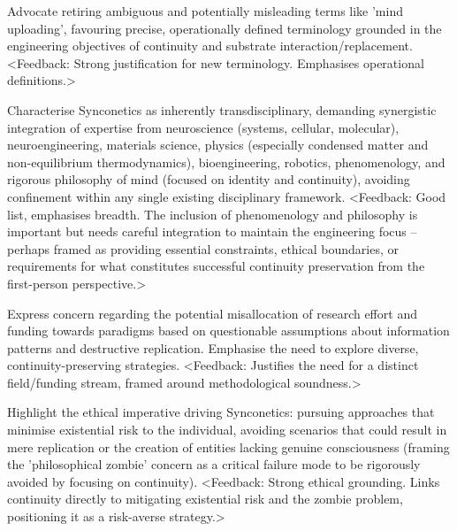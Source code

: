 \documentclass[10pt]{article}
\begin{document}
\begin{sloppypar}
  Advocate retiring ambiguous and potentially misleading terms like 'mind uploading', favouring precise, operationally defined terminology grounded in the engineering objectives of continuity and substrate interaction/replacement. <Feedback: Strong justification for new terminology. Emphasises operational definitions.>

  Characterise Synconetics as inherently transdisciplinary, demanding synergistic integration of expertise from neuroscience (systems, cellular, molecular), neuroengineering, materials science, physics (especially condensed matter and non-equilibrium thermodynamics), bioengineering, robotics, phenomenology, and rigorous philosophy of mind (focused on identity and continuity), avoiding confinement within any single existing disciplinary framework. <Feedback: Good list, emphasises breadth. The inclusion of phenomenology and philosophy is important but needs careful integration to maintain the engineering focus – perhaps framed as providing essential constraints, ethical boundaries, or requirements for what constitutes successful continuity preservation from the first-person perspective.>

  Express concern regarding the potential misallocation of research effort and funding towards paradigms based on questionable assumptions about information patterns and destructive replication. Emphasise the need to explore diverse, continuity-preserving strategies. <Feedback: Justifies the need for a distinct field/funding stream, framed around methodological soundness.>

  Highlight the ethical imperative driving Synconetics: pursuing approaches that minimise existential risk to the individual, avoiding scenarios that could result in mere replication or the creation of entities lacking genuine consciousness (framing the 'philosophical zombie' concern as a critical failure mode to be rigorously avoided by focusing on continuity). <Feedback: Strong ethical grounding. Links continuity directly to mitigating existential risk and the zombie problem, positioning it as a risk-averse strategy.>


\end{sloppypar}
\end{document}
